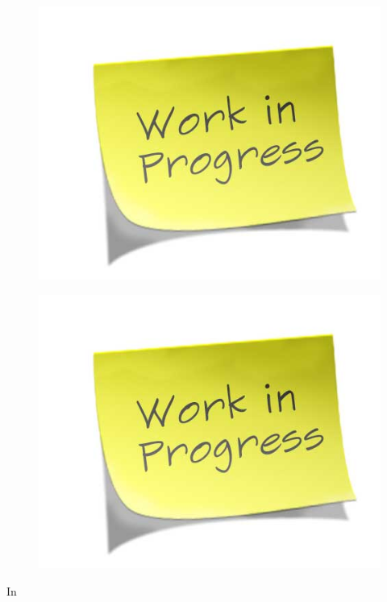 \begin{figure}[H]
\centering
\begin{minipage}{0.5\textwidth}
  \centering
  \includegraphics[width=0.65\linewidth]{report/pictures/missingfigure}
  \label{fig:subsys_1}
\end{minipage}%
\begin{minipage}{0.5\textwidth}
  \centering
  \includegraphics[width=0.65\linewidth]{report/pictures/missingfigure}
  \label{fig:subsys_2}
\end{minipage}
\end{figure}

In 